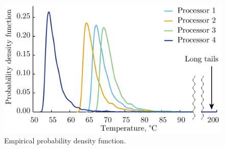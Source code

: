 \begin{figure}[br]
  \vspace{-1.5em}
  \centering
  \includegraphics[width=0.8\linewidth]{include/assets/motivation-pdf.pdf}
  \caption{Empirical probability density function.}
  \vspace{-1.0em}
\end{figure}
